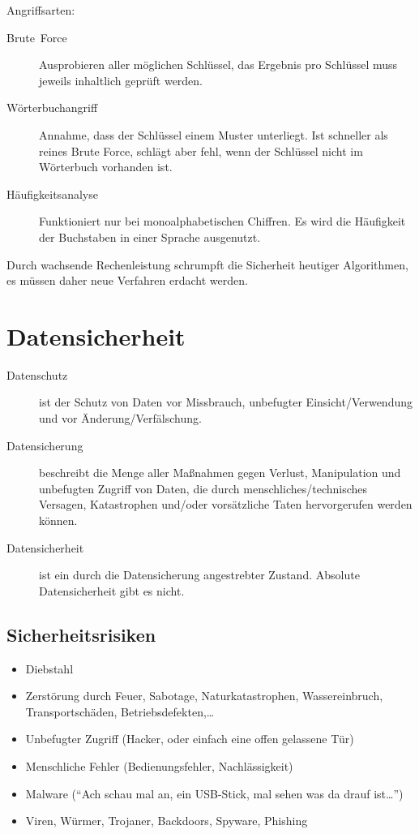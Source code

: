 Angriffsarten:
\begin{description}
  \item [{Brute~Force}] 
	Ausprobieren aller möglichen Schlüssel, das Ergebnis pro Schlüssel muss jeweils inhaltlich geprüft werden.
  \item [{Wörterbuchangriff}] 
	Annahme, dass der Schlüssel einem Muster unterliegt.
	Ist schneller als reines \foreignlanguage{english}{Brute Force}, schlägt aber fehl, wenn der Schlüssel nicht im Wörterbuch vorhanden ist.
  \item [{Häufigkeitsanalyse}] 
	Funktioniert nur bei monoalphabetischen Chiffren.
	Es wird die Häufigkeit der Buchstaben in einer Sprache ausgenutzt.
\end{description}

Durch wachsende Rechenleistung schrumpft die Sicherheit heutiger Algorithmen, es müssen daher neue Verfahren erdacht werden.


\chapter{Datensicherheit}
\begin{description}
  \item [{Datenschutz}] 
	ist der Schutz von Daten vor Missbrauch, unbefugter Einsicht\slash Verwendung und vor Änderung/Verfälschung.
  \item [{Datensicherung}] 
	beschreibt die Menge aller Maßnahmen gegen Verlust, Manipulation und unbefugten Zugriff von Daten,
	die durch menschliches\slash technisches Versagen, Katastrophen und/oder vorsätzliche Taten hervorgerufen werden können.
  \item [{Datensicherheit}] 
	ist ein durch die Datensicherung angestrebter Zustand.
	Absolute Datensicherheit gibt es nicht.
\end{description}

\section{Sicherheitsrisiken}
\begin{itemize}
  \item Diebstahl
  \item Zerstörung durch Feuer, Sabotage, Naturkatastrophen, Wassereinbruch, Transportschäden, Betriebsdefekten,\ldots{}
  \item Unbefugter Zugriff (Hacker, oder einfach eine offen gelassene Tür)
  \item Menschliche Fehler (Bedienungsfehler, Nachlässigkeit)
  \item Malware (\enquote{Ach schau mal an, ein USB-Stick, mal sehen was da drauf ist\ldots{}})
  \item Viren, Würmer, Trojaner, \foreignlanguage{english}{Backdoors}, \foreignlanguage{english}{Spyware}, \foreignlanguage{english}{Phishing}
\end{itemize}


